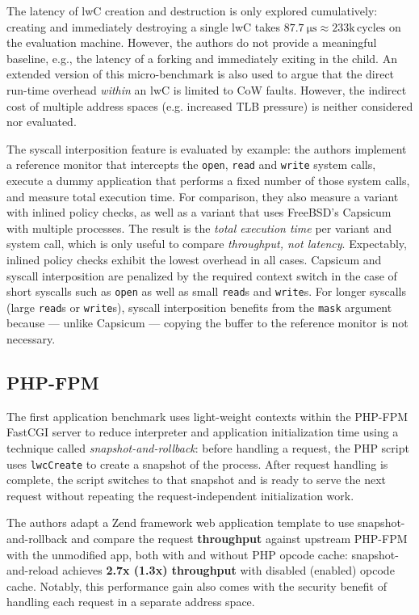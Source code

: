 \documentclass[10pt,twocolumn,a4paper]{article}
\begin{document}
The latency of lwC creation and destruction is only explored cumulatively: creating and immediately destroying a single lwC takes $\SI{87.7}{\micro\second} \approx 233\text{k}\,\text{cycles}$ on the evaluation machine. %
However, the authors do not provide a meaningful baseline, e.g., the latency of a forking and immediately exiting in the child.
An extended version of this micro-benchmark is also used to argue that the direct run-time overhead \textit{within} an lwC is limited to CoW faults.
However, the indirect cost of multiple address spaces (e.g. increased TLB pressure) is neither considered nor evaluated.
\cite{lwcpaper}

The syscall interposition feature is evaluated by example:
the authors implement a reference monitor that intercepts the \lstinline{open}, \lstinline{read} and \lstinline{write} system calls, execute a dummy application that performs a fixed number of those system calls, and measure total execution time.
For comparison, they also measure a variant with inlined policy checks, as well as a variant that uses FreeBSD's Capsicum with multiple processes.
The result is the \textit{total execution time} per variant and system call, which is only useful to compare \textit{throughput, not latency}.
Expectably, inlined policy checks exhibit the lowest overhead in all cases.
Capsicum and syscall interposition are penalized by the required context switch in the case of short syscalls such as \lstinline{open} as well as small \lstinline{read}s and \lstinline{write}s.
For longer syscalls (large \lstinline{read}s or \lstinline{write}s), syscall interposition benefits from the \lstinline{mask} argument because --- unlike Capsicum --- copying the buffer to the reference monitor is not necessary.
\cite{lwcpaper}

\subsection{PHP-FPM}
The first application benchmark uses light-weight contexts within the PHP-FPM FastCGI server to reduce interpreter and application initialization time using a technique called \textit{snapshot-and-rollback}:
before handling a request, the PHP script uses \lstinline{lwcCreate} to create a snapshot of the process.
After request handling is complete, the script switches to that snapshot and is ready to serve the next request without repeating the request-independent initialization work.
\cite{lwcpaper}

The authors adapt a Zend framework web application template to use snapshot-and-rollback and compare the request \textbf{throughput} against upstream PHP-FPM with the unmodified app, both with and without PHP opcode cache:
snapshot-and-reload achieves \textbf{2.7x (1.3x) throughput} with disabled (enabled) opcode cache.
Notably, this performance gain also comes with the security benefit of handling each request in a separate address space.\cite{zend,lwcpaper}
\end{document}

